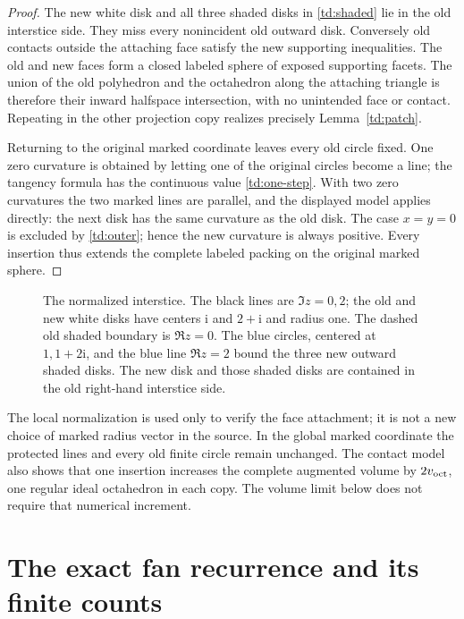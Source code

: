 \documentclass[11pt]{article}
\numberwithin{equation}{section}
\theoremstyle{definition}
\newcommand{\ii}{\mathrm i}
\begin{document}
\begin{proof}
The new white disk and all three shaded disks in
\eqref{td:shaded} lie in the old interstice side. They miss every
nonincident old outward disk. Conversely old contacts outside the
attaching face satisfy the new supporting inequalities. The old
and new faces form a closed labeled sphere of exposed supporting
facets. The union of the old polyhedron and the octahedron along
the attaching triangle is therefore their inward halfspace
intersection, with no unintended face or contact. Repeating in
the other projection copy realizes precisely
Lemma~\ref{td:patch}.

Returning to the original marked coordinate leaves every old
circle fixed. One zero curvature is obtained by letting one of
the original circles become a line; the tangency formula has the
continuous value \eqref{td:one-step}. With two zero curvatures the
two marked lines are parallel, and the displayed model applies
directly: the next disk has the same curvature as the old disk.
The case \(x=y=0\) is excluded by \eqref{td:outer}; hence the new
curvature is always positive. Every insertion thus extends the
complete labeled packing on the original marked sphere.
\end{proof}

\begin{figure}[htbp]
\centering

\caption{The normalized interstice. The black lines are
\(\Im z=0,2\); the old and new white disks have centers \(\ii\)
and \(2+\ii\) and radius one. The dashed old shaded boundary is
\(\Re z=0\). The blue circles, centered at \(1,1+2\ii\), and
the blue line \(\Re z=2\) bound the three new outward shaded
disks. The new disk and those shaded disks are contained in the
old right-hand interstice side.}
\label{td:interstice-figure}
\end{figure}

The local normalization is used only to verify the face attachment;
it is not a new choice of marked radius vector in the source.
In the global marked coordinate the protected lines and every
old finite circle remain unchanged. The contact model also shows
that one insertion increases the complete augmented volume by
\(2v_{\rm oct}\), one regular ideal octahedron in each copy.
The volume limit below does not require that numerical increment.

\section{The exact fan recurrence and its finite counts}
\end{document}
